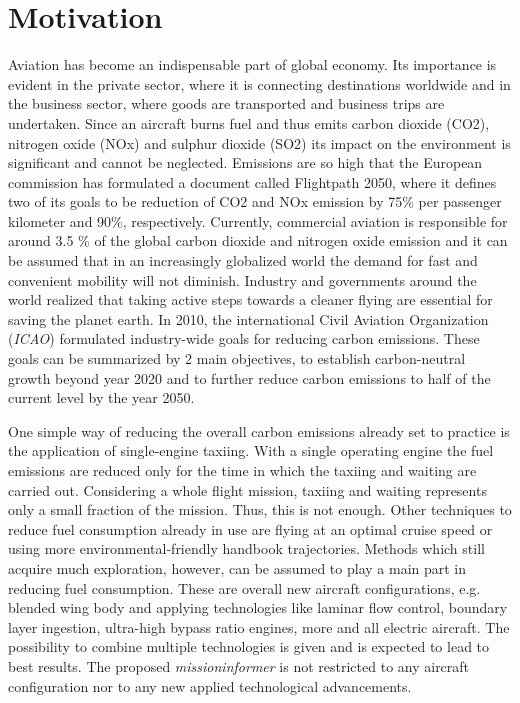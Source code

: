 \section{Motivation}
\label{sec_Motivation}
Aviation has become an 
indispensable part of global economy. Its importance is 
evident in the private sector, where it is connecting
destinations worldwide
and in the business sector, where goods are transported and 
business trips are undertaken. Since an aircraft burns fuel and thus 
emits carbon dioxide (CO2), nitrogen oxide (NOx) and 
sulphur dioxide (SO2) its impact on 
the environment is significant 
and cannot be neglected. Emissions are so high that the European commission has 
formulated a document called Flightpath 2050, where it defines two 
of its goals to be reduction of CO2 and NOx emission by 75\% 
per passenger kilometer
and 90\%, respectively. 
Currently, commercial aviation is responsible
 for around 
3.5 \% of the global carbon dioxide and nitrogen 
oxide 
emission \cite{lee_contribution_2021}
and it can be assumed that in an increasingly globalized world the demand 
for fast and convenient mobility will not diminish. 
Industry and governments 
around the world realized that taking active steps towards a cleaner 
flying are essential for saving the planet earth. In 2010, the 
international Civil Aviation Organization (\emph{ICAO}) formulated 
industry-wide goals for reducing carbon emissions. 
These goals can be summarized by 2 main 
objectives, to establish carbon-neutral growth beyond  
year 2020 and to further reduce carbon emissions to half of 
the current level by the year 2050.\newline

One simple way of reducing the overall carbon emissions  
already set to practice is the application of single-engine taxiing. 
With a single operating engine
the fuel emissions are reduced only 
for the time in which the taxiing and waiting are carried out.
Considering a whole flight mission, taxiing and waiting
represents only a small fraction of the mission. Thus, this is 
not enough. Other techniques to reduce fuel consumption 
already in use are flying at an optimal cruise speed or 
using more environmental-friendly handbook trajectories. Methods 
which still acquire much exploration, however, 
can be assumed to play a main part in reducing fuel consumption.
These are overall new 
aircraft configurations, e.g. blended wing body and applying
technologies like laminar flow control, boundary layer 
ingestion, ultra-high bypass ratio engines, more and all electric 
aircraft. The possibility 
to combine multiple technologies is given and 
is expected to lead to best results. The proposed \emph{missioninformer} 
is not restricted to any aircraft configuration nor 
to any new applied technological advancements.\newline

